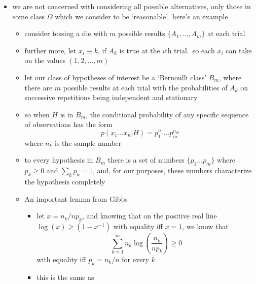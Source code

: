 \documentclass[../jaynes_prob_theory_notes.tex]{subfiles}
\begin{document}
\begin{itemize}
                \item we are not concerned with considering all possible alternatives, only those in some class $\Omega$ which we consider to be `reasonable'.\ here's an example
                    \begin{itemize}
                        \item consider tossing a die with $m$ possible results $\{A_1, \ldots, A_m\}$ at each trial
                        \item further more, let $x_i \equiv k$, if $A_k$ is true at the $i$th trial.\ so each $x_i$ can take on the values $(1,2, \ldots, m)$
                        \item let our class of hypotheses of interest be a `Bernoulli class' $B_m$, where there are $m$ possible results at each trial with the probabilities of $A_k$ on successive repetitions being independent and stationary
                        \item so when $H$ is in $B_m$, the conditional probability of any specific sequence of observations has the form
                            \begin{equation*}
                                p(x_1 \ldots x_n | H) = p^{n_1}_{1} \ldots p^{n_m}_{m}
                            \end{equation*}
                            where $n_k$ is the sample number
                        \item to every hypothesis in $B_m$ there is a set of numbers $\{p_1 \ldots p_m \}$ where $p_k \geq 0$ and $\sum_k p_k = 1$, and, for our purposes, these numbers characterize the hypothesis completely
                        \item An important lemma from Gibbs
                            \begin{itemize}
                                \item let $x=n_k /np_k$, and knowing that on the positive real line $\log (x) \geq (1-x^{-1})$ with equality iff $x=1$, we know that
                                    \begin{equation*}
                                        \sum\limits^{m}_{k=1} n_k \log \left( \frac{n_k}{np_k} \right) \geq 0
                                    \end{equation*}
                                    with equality iff $p_k = n_k / n$ for every $k$
                                \item this is the same as 
                                    \begin{equation*}

\end{equation*}
\end{itemize}
\end{itemize}
\end{itemize}
\end{document}
